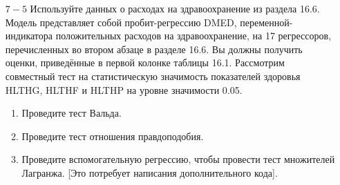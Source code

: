 \begin{enumerate}
\begin{enumerate}
\end{enumerate}
\item [$7-5$] Используйте данных о расходах на здравоохранение из раздела 16.6. Модель представляет собой пробит-регрессию DMED, переменной-индикатора положительных расходов на здравоохранение, на 17 регрессоров, перечисленных во втором абзаце в разделе 16.6. Вы должны получить оценки, приведённые в первой колонке таблицы 16.1. Рассмотрим совместный тест на статистическую значимость показателей здоровья HLTHG, HLTHF и HLTHP на уровне значимости 0.05.
\begin{enumerate}
\item Проведите тест Вальда.
\item Проведите тест отношения правдоподобия.
\item Проведите вспомогательную регрессию, чтобы провести тест множителей Лагранжа. [Это потребует написания дополнительного кода].
\end{enumerate}
\end{enumerate}

